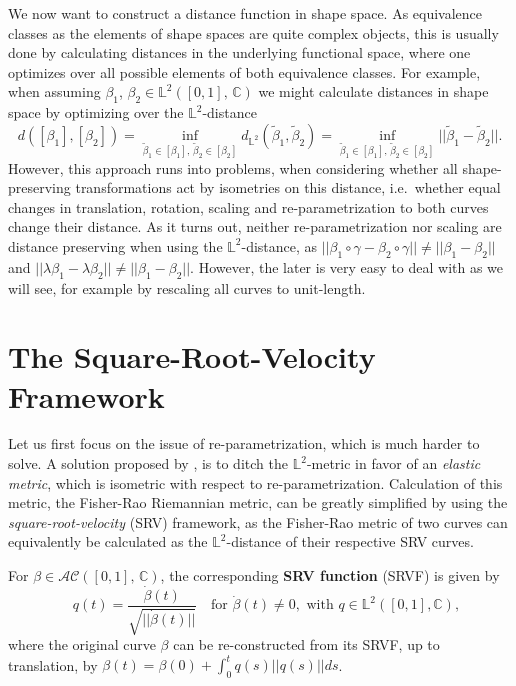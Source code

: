 \noindent We now want to construct a distance function in shape space.
As equivalence classes as the elements of shape spaces are quite complex objects, this is usually done by calculating distances in the underlying functional space, where one optimizes over all possible elements of both equivalence classes.
For example, when assuming $\beta_1$, $\beta_2 \in \mathbb{L}^2([0,1],\, \mathbb{C})$ we might calculate distances in shape space by optimizing over the $\mathbb{L}^2$-distance
$$d([\beta_1], [\beta_2]) = \inf_{\tilde \beta_1 \in [\beta_1],\,\tilde \beta_2 \in [\beta_2]} d_{\mathbb{L}^2}(\tilde \beta_1, \tilde \beta_2) = \inf_{\tilde\beta_1 \in [\beta_1],\, \tilde\beta_2 \in [\beta_2]} || \tilde\beta_1 - \tilde\beta_2 ||.$$
However, this approach runs into problems, when considering whether all shape-preserving transformations act by isometries on this distance, i.e.\ whether equal changes in translation, rotation, scaling and re-parametrization to both curves change their distance. 
As it turns out, neither re-parametrization nor scaling are distance preserving when using the $\mathbb{L}^2$-distance, as $||\beta_1 \circ \gamma - \beta_2 \circ \gamma|| \neq ||\beta_1 - \beta_2||$ and $||\lambda \beta_1 - \lambda \beta_2|| \neq ||\beta_1 - \beta_2||$.
However, the later is very easy to deal with as we will see, for example by rescaling all curves to unit-length.



\section{The Square-Root-Velocity Framework}
\label{theo:srv}
Let us first focus on the issue of re-parametrization, which is much harder to solve.
A solution proposed by \cite{SrivastavaEtAl2011}, is to ditch the $\mathbb{L}^2$-metric in favor of an \textit{elastic metric}, which is isometric with respect to re-parametrization.
Calculation of this metric, the Fisher-Rao Riemannian metric, can be greatly simplified by using the \textit{square-root-velocity} (SRV) framework, as the Fisher-Rao metric of two curves can equivalently be calculated as the $\mathbb{L}^2$-distance of their respective SRV curves.

\begin{definition}
  For $\beta \in \mathcal{AC}([0,1],\,\mathbb{C})$, the corresponding \textbf{SRV function} (SRVF) is given by
$$ \quad q(t) = \frac{\dot{\beta}(t)}{\sqrt{|| \dot{\beta}(t) ||}} \quad \text{for} \,\, \dot{\beta}(t) \neq 0, \,\, \text{with} \,\, q \in \mathbb{L}^2([0,1], \mathbb{C}),$$
  where the original curve $\beta$ can be re-constructed from its SRVF, up to translation, by $\beta(t) = \beta(0) + \int_0^t q(s) || q(s) || ds$.
\end{definition}

